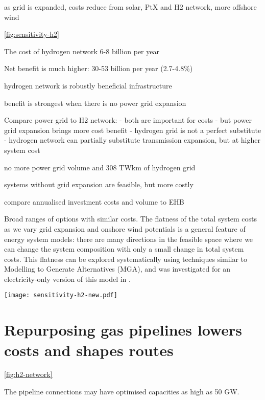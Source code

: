 as grid is expanded, costs reduce from solar, PtX and H2 network, more offshore wind


\cref{fig:sensitivity-h2}

The cost of hydrogen network 6-8 billion per year

Net benefit is much higher: 30-53 billion per year (2.7-4.8\%)

hydrogen network is robustly beneficial infrastructure

benefit is strongest when there is no power grid expansion

Compare power grid to H2 network:
- both are important for costs
- but power grid expansion brings more cost benefit
- hydrogen grid is not a perfect substitute
- hydrogen network can partially substitute transmission expansion, but at higher system cost


no more power grid volume and 308 TWkm of hydrogen grid

systems without grid expansion are feasible, but more costly

compare annualised investment costs and volume to EHB

Broad ranges of options with similar costs. The flatness of the total system
costs as we vary grid expansion and onshore wind potentials is a general feature
of energy system models: there are many directions in the feasible space where
we can change the system composition with only a small change in total system
costs. This flatness can be explored systematically using techniques similar to
Modelling to Generate Alternatives (MGA), and was investigated for an
electricity-only version of this model in \cite{Neumann2019}.

\begin{SCfigure}
    \centering
    \texttt{[image: sensitivity-h2-new.pdf]}
    \caption{Benefits of electricity and hydrogen network infrastructure.}
    \label{fig:sensitivity-h2}
\end{SCfigure}


\section*{Repurposing gas pipelines lowers costs and shapes routes}
\label{sec:repurposed}


\cref{fig:h2-network}

The pipeline connections may have optimised capacities as high as 50 GW.

